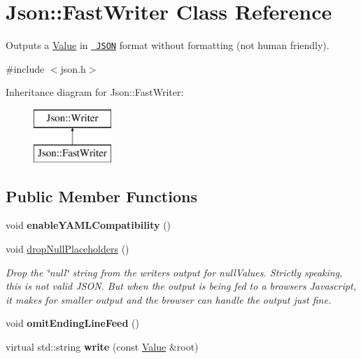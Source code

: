 \hypertarget{class_json_1_1_fast_writer}{}\section{Json\+::Fast\+Writer Class Reference}
\label{class_json_1_1_fast_writer}


Outputs a \mbox{\hyperlink{class_json_1_1_value}{Value}} in \href{http://www.json.org}{\texttt{ J\+S\+ON}} format without formatting (not human friendly).  




{\ttfamily \#include $<$json.\+h$>$}

Inheritance diagram for Json\+::Fast\+Writer\+:\begin{figure}[H]
\begin{center}
\leavevmode
\includegraphics[height=2.000000cm]{class_json_1_1_fast_writer}
\end{center}
\end{figure}
\subsection*{Public Member Functions}
\begin{DoxyCompactItemize}
\item 
\mbox{\label{class_json_1_1_fast_writer_a78d98e9f76d33660ad6e6a1abe287d45}} 
void {\bfseries enable\+Y\+A\+M\+L\+Compatibility} ()
\item 
\mbox{\label{class_json_1_1_fast_writer_a6e93d8dce951e408517311026a065b40}} 
void \mbox{\hyperlink{class_json_1_1_fast_writer_a6e93d8dce951e408517311026a065b40}{drop\+Null\+Placeholders}} ()
\begin{DoxyCompactList}\small\item\em Drop the \char`\"{}null\char`\"{} string from the writer\textquotesingle{}s output for null\+Values. Strictly speaking, this is not valid J\+S\+ON. But when the output is being fed to a browser\textquotesingle{}s Javascript, it makes for smaller output and the browser can handle the output just fine. \end{DoxyCompactList}\item 
\mbox{\label{class_json_1_1_fast_writer_af4ee077d365d75941fb2688d97207a55}} 
void {\bfseries omit\+Ending\+Line\+Feed} ()
\item 
\mbox{\label{class_json_1_1_fast_writer_a0f64b9e1fce6b743aad3f100cfc33427}} 
virtual std\+::string {\bfseries write} (const \mbox{\hyperlink{class_json_1_1_value}{Value}} \&root)
\end{DoxyCompactItemize}


